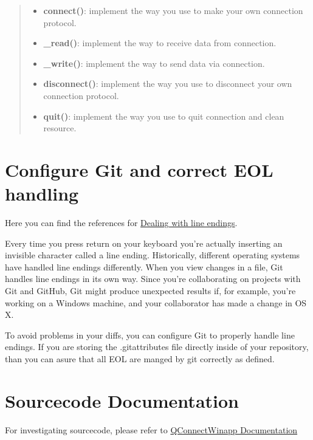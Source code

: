 \begin{quote}
\begin{itemize}
\tightlist
\item
  \textbf{connect()}: implement the way you use to make your own
  connection protocol.
\item
  \textbf{\_read()}: implement the way to receive data from connection.
\item
  \textbf{\_write()}: implement the way to send data via connection.
\item
  \textbf{disconnect()}: implement the way you use to disconnect your
  own connection protocol.
\item
  \textbf{quit()}: implement the way you use to quit connection and
  clean resource.
\end{itemize}
\end{quote}

\hypertarget{configure-git-and-correct-eol-handling}{%
\section{Configure Git and correct EOL
handling}\label{configure-git-and-correct-eol-handling}}

Here you can find the references for
\href{https://help.github.com/articles/dealing-with-line-endings/}{Dealing
with line endings}.

Every time you press return on your keyboard you're actually inserting
an invisible character called a line ending. Historically, different
operating systems have handled line endings differently. When you view
changes in a file, Git handles line endings in its own way. Since you're
collaborating on projects with Git and GitHub, Git might produce
unexpected results if, for example, you're working on a Windows machine,
and your collaborator has made a change in OS X.

To avoid problems in your diffs, you can configure Git to properly
handle line endings. If you are storing the .gitattributes file directly
inside of your repository, than you can asure that all EOL are manged by
git correctly as defined.

\hypertarget{sourcecode-documentation}{%
\section{Sourcecode Documentation}\label{sourcecode-documentation}}

For investigating sourcecode, please refer to
\href{docs/html/index.html}{QConnectWinapp Documentation}

